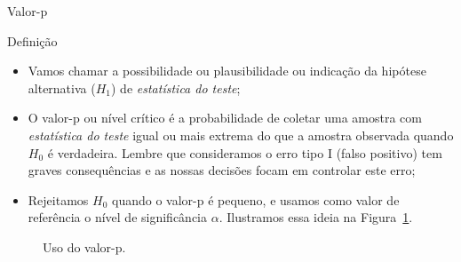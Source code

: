 \documentclass[8pt]{beamer}
\begin{document}
\begin{frame}{Valor-p}

\normalsize

	\begin{block}{Definição}
		\begin{itemize}
			\item Vamos chamar a possibilidade ou plausibilidade ou indicação da hipótese alternativa ($H_1$) de \textit{estatística do teste};
			\item O valor-p ou nível crítico é a probabilidade de coletar uma amostra com \textit{estatística do teste} igual ou mais extrema do que a amostra observada quando $H_0$ é verdadeira. Lembre que consideramos o erro tipo I (falso positivo) tem graves consequências e as nossas decisões focam em controlar este erro;
			\item Rejeitamos $H_0$ quando o valor-p é pequeno, e usamos como valor de referência o nível de significância $\alpha$. Ilustramos essa ideia na Figura~\ref{fig:p-valor}.
		\end{itemize}			
	\begin{figure}[htbp]
		\centering
		\caption{Uso do valor-p.}
		\label{fig:p-valor}
	\end{figure}
	\end{block}

\normalsize

\end{frame}
\end{document}
